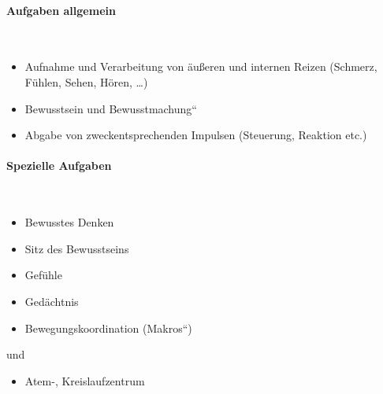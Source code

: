 \paragraph{Aufgaben allgemein}~

\begin{itemize}
    \item Aufnahme  und Verarbeitung  von äußeren und internen  Reizen
    (Schmerz, Fühlen, Sehen, Hören, {\dots})
    \item Bewusstsein und {\quotedblbase}Bewusstmachung{\textquotedblleft}
    \item Abgabe  von zweckentsprechenden Impulsen (Steuerung, Reaktion
    etc.)
\end{itemize}



\paragraph{Spezielle Aufgaben}~



\begin{itemize}
    \item Bewusstes Denken
    \item Sitz des Bewusstseins
    \item Gefühle
    \item Gedächtnis
\end{itemize}



\begin{itemize}
    \item Bewegungskoordination ({\quotedblbase}Makros{\textquotedblleft})
\end{itemize}

 und 

\begin{itemize}
    \item Atem-, Kreislaufzentrum
\end{itemize}


